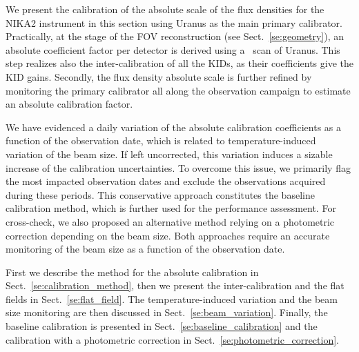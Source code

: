 
We present the calibration of the absolute scale of the flux densities
for the NIKA2 instrument in this section using Uranus as the main
primary calibrator. Practically, at the stage of the FOV
reconstruction (see Sect.~\ref{se:geometry}), an absolute
coefficient factor per detector is derived using a \bm\ scan of
Uranus. This step realizes also the inter-calibration of all the KIDs,
as their coefficients give the KID gains. Secondly, the flux
density absolute scale is further refined by monitoring the primary
calibrator all along the observation campaign to estimate an
absolute calibration factor.

We have evidenced a daily variation of the absolute calibration
coefficients as a function of the observation date, which is related
to temperature-induced variation of the beam size. If left uncorrected, this variation
induces a sizable increase of the calibration uncertainties. To
overcome this issue, we primarily flag the most impacted observation
dates and exclude the observations acquired during these periods. This
conservative approach constitutes the baseline calibration method,
which is further used for the performance assessment. For cross-check,
we also proposed an alternative method relying on a photometric
correction depending on the beam size. Both approaches require an
accurate monitoring of the beam size as a function of the observation
date.

First we describe the method for the absolute calibration in
Sect.~\ref{se:calibration_method}, then we present the
inter-calibration and the flat fields in
Sect.~\ref{se:flat_field}. The temperature-induced variation and the
beam size monitoring are then discussed in
Sect.~\ref{se:beam_variation}. Finally, the baseline calibration is
presented in Sect.~\ref{se:baseline_calibration} and the calibration
with a photometric correction in
Sect.~\ref{se:photometric_correction}.  




